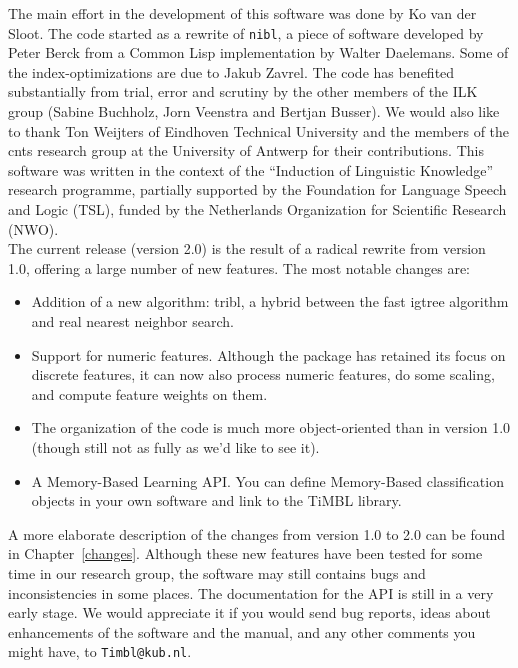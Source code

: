 \documentclass{report}
\begin{document}
The main effort in the development of this software was done by Ko van
der Sloot. The code started as a rewrite of {\tt nibl}, a piece of
software developed by Peter Berck from a Common Lisp implementation by
Walter Daelemans. Some of the index-optimizations are due to Jakub
Zavrel. The code has benefited substantially from trial, error and
scrutiny by the other members of the ILK group (Sabine Buchholz, Jorn
Veenstra and Bertjan Busser). We would also like to thank Ton Weijters
of Eindhoven Technical University and the members of the {\sc
cnts} research group at the University of Antwerp for their
contributions. This software was written in the context of the
``Induction of Linguistic Knowledge'' research programme, partially
supported by the Foundation for Language Speech and Logic (TSL),
funded by the Netherlands Organization for Scientific Research
(NWO).\\

The current release (version 2.0) is the result of a radical rewrite
from version 1.0, offering a large number of new features. The most
notable changes are:

\begin{itemize}

\item Addition of a new algorithm: {\sc tribl}, a hybrid between the
fast {\sc igtree} algorithm and real nearest neighbor search.

\item Support for numeric features. Although the package has retained
its focus on discrete features, it can now also process numeric
features, do some scaling, and compute feature weights on them.

\item The organization of the code is much more object-oriented than
in version 1.0 (though still not as fully as we'd like to see it).

\item A Memory-Based Learning API. You can define Memory-Based
classification objects in your own software and link to the TiMBL
library.

\end{itemize}

A more elaborate description of the changes from version 1.0 to 2.0
can be found in Chapter~\ref{changes}. Although these new features
have been tested for some time in our research group, the software may
still contains bugs and inconsistencies in some places. The
documentation for the API is still in a very early stage. We would
appreciate it if you would send bug reports, ideas about enhancements
of the software and the manual, and any other comments you might have,
to {\tt Timbl@kub.nl}.\\
\end{document}

